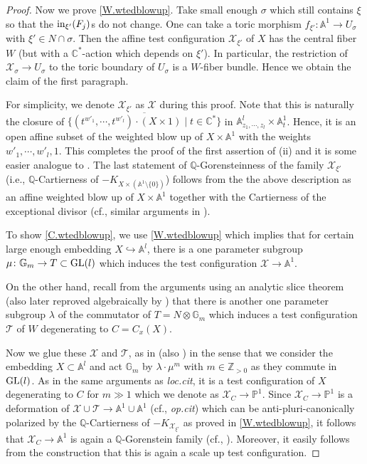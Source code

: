\documentclass[12pt,a4paper]{amsart}
\theoremstyle{remark}
\theoremstyle{definition}
\def\C{\mathbb{C}}
\def\G{\mathbb{G}}
\def\Z{\mathbb{Z}}
\def\P{\mathbb{P}}
\def\Q{\mathbb{Q}}
\def\A{\mathbb{A}}
\def\X{\mathcal{X}}
\begin{document}
\begin{proof}
Now we prove \eqref{W.wtedblowup}. Take small enough $\sigma$ which still contains 
$\xi$ so that the ${\rm in}_{\xi'}(F_j)$s do not 
change. 
One can take a toric morphism $f_{\xi'}\colon \A^1\to U_\sigma$ 
with $\xi' \in N\cap \sigma$. 
Then the affine test configuration $\mathcal{X}_{\xi'}$ 
of $X$ has the central fiber $W$ 
(but with a $\C^*$-action which depends on $\xi'$). 
In particular, the restriction of 
$\X_{\sigma}\to U_{\sigma}$ 
to the toric boundary of $U_\sigma$ is a $W$-fiber bundle. 
Hence we obtain the claim of the first paragraph. 

For simplicity, we denote $\mathcal{X}_{\xi'}$ as $\mathcal{X}$ during this proof. 
Note that this is naturally the closure of 
$\overline{\{(t^{w'_1},\cdots,t^{w'_l})\cdot (X\times 1)\mid t\in \C^*\}}$ 
in $\A^l_{z_1,\cdots,z_l}\times \A^1_t$. 
Hence, it is an open affine subset of the weighted blow up of 
$X\times \A^1$ with the weights 
$w'_1,\cdots,w'_l,1$. This completes the proof of the first assertion of 
(ii) and it is some easier analogue to \cite[\S 2.4, Lemma 2.25]{Od24c}. 
The last statement of $\Q$-Gorensteinness of the family $\X_{\xi'}$ 
(i.e., $\Q$-Cartierness of $-K_{X\times (\A^1\setminus \{0\})}$) 
follows from the 
the above description as an 
affine weighted blow up of 
$X\times \A^1$ together with the Cartierness of the exceptional divisor 
(cf., similar arguments in \cite[\S 2, Lemma 2.4]{OSS}). 

To show \eqref{C.wtedblowup}, 
we use \eqref{W.wtedblowup}  which implies that 
for certain 
large enough embedding $X\hookrightarrow \A^l$, 
there is a one parameter subgroup 
$\mu\colon \G_m\to T\subset {\rm GL}(l)$ 
which induces the test configuration $\X\to \A^1$. 

On the other hand, recall from the arguments 
\cite[p.354]{DSII} using an analytic slice theorem 
(also later reproved 
algebraically by \cite{LWX}) that  
there is another one parameter subgroup $\lambda$ 
of the commutator of $T=N\otimes \G_m$ 
which induces a test configuration $\mathcal{T}$ of $W$ 
degenerating to $C=C_x(X)$. 

Now we glue these $\X$ and $\mathcal{T}$, 
as in \cite[3.1]{LWX} (also \cite[proof of 4.5]{grav}) 
in the sense that we consider the embedding 
$X\subset \A^l$ and act $\G_m$ by $\lambda \cdot \mu^m$ with 
$m\in \Z_{>0}$ 
as they commute in ${\rm GL}(l)$. 
As in the same arguments as {\it loc.cit}, 
it is a test configuration of $X$ degenerating to 
$C$ for $m\gg 1$ which we denote as $\X_C\to \P^1$. 
Since $\X_C\to \P^1$ is a deformation of 
$\mathcal{X}\cup \mathcal{T}\to \A^1\cup \A^1$ (cf., {\it op.cit}) 
which can be anti-pluri-canonically polarized by the 
$\Q$-Cartierness of $-K_{\X_{\xi'}}$ as proved in 
\eqref{W.wtedblowup}, it follows that $\X_C\to \A^1$ is again a 
$\Q$-Gorenstein family (cf., \cite[\S 2, Lemma 2.4]{OSS}). 
Moreover, it easily follows from the construction that 
this is again a scale up test configuration. 

\end{proof}
\end{document}

